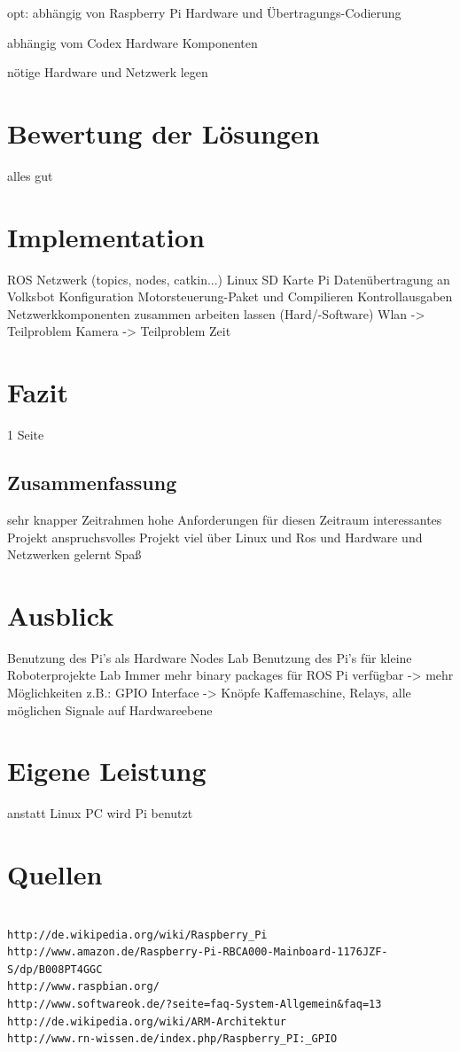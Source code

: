 \documentclass[12pt]{article}
\begin{document}
opt:
abhängig von Raspberry Pi Hardware und Übertragungs-Codierung

abhängig vom Codex Hardware Komponenten

nötige Hardware und Netzwerk legen

\section{Bewertung der Lösungen}

alles gut

\section{Implementation}

ROS Netzwerk (topics, nodes, catkin...)
Linux SD Karte Pi
Datenübertragung an Volksbot
Konfiguration Motorsteuerung-Paket und Compilieren
Kontrollausgaben 
Netzwerkkomponenten zusammen arbeiten lassen (Hard/-Software)
Wlan -> Teilproblem
Kamera -> Teilproblem Zeit


\section{Fazit}
1 Seite
\subsection{Zusammenfassung}

sehr knapper Zeitrahmen
hohe Anforderungen für diesen Zeitraum
interessantes Projekt
anspruchsvolles Projekt
viel über Linux und Ros und Hardware und Netzwerken gelernt
Spaß

\section{Ausblick}

Benutzung des Pi's als Hardware Nodes Lab
Benutzung des Pi's für kleine Roboterprojekte Lab
Immer mehr binary packages für ROS Pi verfügbar -> mehr Möglichkeiten
z.B.: GPIO Interface -> Knöpfe Kaffemaschine, Relays, alle möglichen Signale
auf Hardwareebene

\section{Eigene Leistung}

anstatt Linux PC wird Pi benutzt

\section{Quellen}
\begin{verbatim}

http://de.wikipedia.org/wiki/Raspberry_Pi
http://www.amazon.de/Raspberry-Pi-RBCA000-Mainboard-1176JZF-S/dp/B008PT4GGC
http://www.raspbian.org/
http://www.softwareok.de/?seite=faq-System-Allgemein&faq=13
http://de.wikipedia.org/wiki/ARM-Architektur
http://www.rn-wissen.de/index.php/Raspberry_PI:_GPIO

\end{verbatim}
\end{document}
